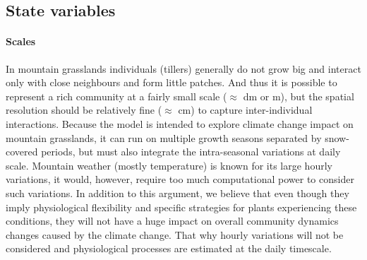 \subsection{State variables}

\paragraph{Scales}
In mountain grasslands individuals (tillers) generally do not grow big and interact only with close neighbours and form little patches. And thus it is possible to represent a rich community at a fairly small scale ($\approx$ dm or m), but the spatial resolution should be relatively fine ($\approx$ cm) to capture inter-individual interactions. Because the model is intended to explore climate change impact on mountain grasslands, it can run on multiple growth seasons separated by snow-covered periods, but must also integrate the intra-seasonal variations at daily scale. Mountain weather (mostly temperature) is known for its large hourly variations, it would, however, require too much computational power to consider such variations. In addition to this argument, we believe that even though they imply physiological flexibility and specific strategies for plants experiencing these conditions, they will not have a huge impact on overall community dynamics changes caused by the climate change. That why hourly variations will not be considered and physiological processes are estimated at the daily timescale.

